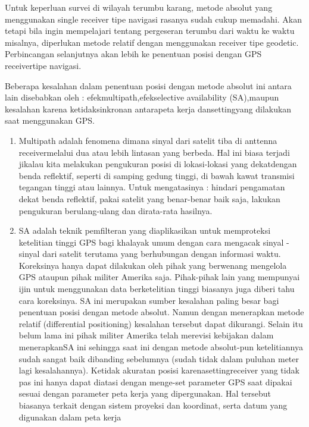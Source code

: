 Untuk keperluan survei di wilayah terumbu karang, metode absolut yang menggunakan single receiver tipe navigasi rasanya sudah cukup memadahi. Akan tetapi bila ingin mempelajari tentang pergeseran terumbu dari waktu ke waktu misalnya, diperlukan metode relatif dengan menggunakan receiver tipe geodetic. Perbincangan selanjutnya akan lebih ke penentuan posisi dengan GPS receivertipe navigasi. 

Beberapa kesalahan dalam penentuan posisi dengan metode absolut ini antara lain disebabkan oleh : efekmultipath,efekselective availability (SA),maupun kesalahan karena ketidaksinkronan antarapeta kerja dansettingyang dilakukan saat menggunakan GPS. 

\begin{enumerate}
	\item Multipath adalah fenomena dimana sinyal dari satelit tiba di anttenna receivermelalui dua atau lebih lintasan yang berbeda. Hal ini biasa terjadi jikalau kita melakukan pengukuran posisi di lokasi-lokasi yang dekatdengan benda reflektif, seperti di samping gedung tinggi, di bawah kawat transmisi tegangan tinggi atau lainnya. Untuk mengatasinya : hindari pengamatan dekat benda reflektif, pakai satelit yang benar-benar baik saja, lakukan pengukuran berulang-ulang dan dirata-rata hasilnya. 
	\item SA adalah teknik pemfilteran yang diaplikasikan untuk memproteksi ketelitian tinggi GPS bagi khalayak umum dengan cara mengacak sinyal - sinyal dari satelit terutama yang berhubungan dengan informasi waktu. Koreksinya hanya dapat dilakukan oleh pihak yang berwenang mengelola GPS ataupun pihak militer Amerika saja. Pihak-pihak lain yang mempunyai ijin untuk menggunakan data berketelitian tinggi biasanya juga diberi tahu cara koreksinya. SA ini merupakan sumber kesalahan paling besar bagi penentuan posisi dengan metode absolut. Namun dengan menerapkan metode relatif (differential positioning) kesalahan tersebut dapat dikurangi. Selain itu belum lama ini pihak militer Amerika telah merevisi kebijakan dalam menerapkanSA ini sehingga saat ini dengan metode absolut-pun ketelitiannya sudah sangat baik dibanding sebelumnya (sudah tidak dalam puluhan meter lagi kesalahannya). Ketidak akuratan posisi karenasettingreceiver yang tidak pas ini hanya dapat diatasi dengan menge-set parameter GPS saat dipakai sesuai dengan parameter peta kerja yang dipergunakan. Hal tersebut biasanya terkait dengan sistem proyeksi dan koordinat, serta datum yang digunakan dalam peta kerja
\end{enumerate}

